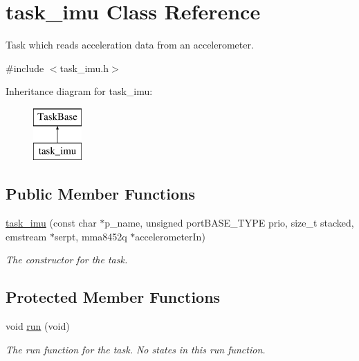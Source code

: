 \hypertarget{classtask__imu}{}\section{task\+\_\+imu Class Reference}
\label{classtask__imu}


Task which reads acceleration data from an accelerometer.  




{\ttfamily \#include $<$task\+\_\+imu.\+h$>$}

Inheritance diagram for task\+\_\+imu\+:\begin{figure}[H]
\begin{center}
\leavevmode
\includegraphics[height=2.000000cm]{classtask__imu}
\end{center}
\end{figure}
\subsection*{Public Member Functions}
\begin{DoxyCompactItemize}
\item 
\hyperlink{classtask__imu_a2e791d5b78ce8691e1086ea369609b74}{task\+\_\+imu} (const char $\ast$p\+\_\+name, unsigned port\+B\+A\+S\+E\+\_\+\+T\+Y\+PE prio, size\+\_\+t stacked, emstream $\ast$serpt, mma8452q $\ast$accelerometer\+In)
\begin{DoxyCompactList}\small\item\em The constructor for the task. \end{DoxyCompactList}\end{DoxyCompactItemize}
\subsection*{Protected Member Functions}
\begin{DoxyCompactItemize}
\item 
void \hyperlink{classtask__imu_ae05d282ee631de7e7c958b9a37c2651d}{run} (void)
\begin{DoxyCompactList}\small\item\em The run function for the task. No states in this run function. \end{DoxyCompactList}\end{DoxyCompactItemize}
